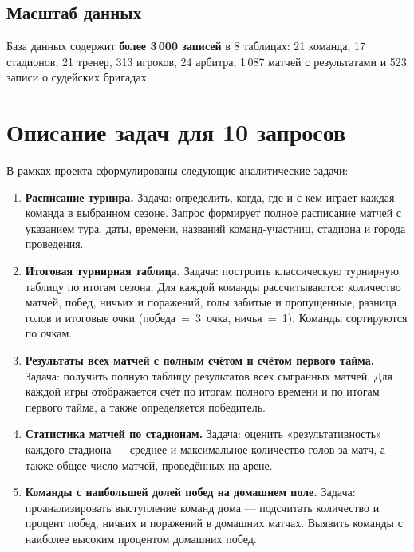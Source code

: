\documentclass[14pt,a4paper]{extarticle}
\begin{document}
\subsection{Масштаб данных}

База данных содержит \textbf{более 3\,000 записей} в 8 таблицах:
21 команда, 17 стадионов, 21 тренер, 313 игроков, 24 арбитра,
1\,087 матчей с результатами и 523 записи о судейских бригадах.

\section{Описание задач для 10 запросов}

В рамках проекта сформулированы следующие аналитические задачи:

\begin{enumerate}

  \item \textbf{Расписание турнира.}
  Задача: определить, когда, где и с кем играет каждая команда в выбранном
  сезоне. Запрос формирует полное расписание матчей с указанием тура, даты,
  времени, названий команд-участниц, стадиона и города проведения.

  \item \textbf{Итоговая турнирная таблица.}
  Задача: построить классическую турнирную таблицу по итогам сезона. Для каждой
  команды рассчитываются: количество матчей, побед, ничьих и поражений, голы
  забитые и пропущенные, разница голов и итоговые очки (победа~=~3~очка,
  ничья~=~1). Команды сортируются по очкам.

  \item \textbf{Результаты всех матчей с полным счётом и счётом первого тайма.}
  Задача: получить полную таблицу результатов всех сыгранных матчей. Для каждой
  игры отображается счёт по итогам полного времени и по итогам первого тайма,
  а также определяется победитель.

  \item \textbf{Статистика матчей по стадионам.}
  Задача: оценить «результативность» каждого стадиона — среднее и максимальное
  количество голов за матч, а также общее число матчей, проведённых на арене.

  \item \textbf{Команды с наибольшей долей побед на домашнем поле.}
  Задача: проанализировать выступление команд дома — подсчитать количество и
  процент побед, ничьих и поражений в домашних матчах. Выявить команды с
  наиболее высоким процентом домашних побед.


\end{enumerate}
\end{document}
